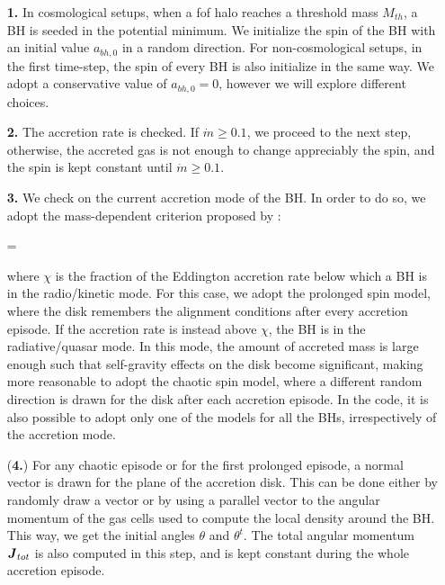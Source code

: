 \documentclass[a4,useAMS,usenatbib,usegraphicx,12pt]{article}
\begin{document}
\begin{itemize}

 \item[\textbf{1.}] In cosmological setups, when a fof halo reaches a threshold mass $M_{th}$, a 
 BH is seeded in the potential minimum. We initialize the spin of the BH with an initial value 
 $a_{bh,0}$ in a random direction. For non-cosmological setups, in the first time-step, the spin 
 of every BH is also initialize in the same way. We adopt a conservative value of $a_{bh,0} = 0$, 
 however we will explore different choices.
 
 \item[\textbf{2.}] The accretion rate is checked. If $\dot{m} \geq 0.1$, we proceed to the next 
 step, otherwise, the accreted gas is not enough to change appreciably the spin, and the spin is 
 kept constant until $\dot{m} \geq 0.1$.
 
 \item[\textbf{3.}] We check on the current accretion mode of the BH. In order to do so, we adopt 
 the mass-dependent criterion proposed by \citet{Weinberger2016}:
 
 { \chi = \min {} }
 
 where $\chi$ is the fraction of the Eddington accretion rate below which a BH is in the radio/kinetic 
 mode. For this case, we adopt the prolonged spin model, where the disk remembers the alignment 
 conditions after every accretion episode. If the accretion rate is instead above $\chi$, the BH is 
 in the radiative/quasar mode. In this mode, the amount of accreted mass is large enough such that 
 self-gravity effects on the disk become significant, making more reasonable to adopt the chaotic 
 spin model, where a different random direction is drawn for the disk after each accretion episode.
 In the code, it is also possible to adopt only one of the models for all the BHs, irrespectively of
 the accretion mode.
 
 \item[(\textbf{4.})] For any chaotic episode or for the first prolonged episode, a normal vector is 
 drawn for the plane of the accretion disk. This can be done either by randomly draw a vector or by 
 using a parallel vector to the angular momentum of the gas cells used to compute the local density 
 around the BH. This way, we get the initial angles $\theta$ and $\theta^t$. The total angular 
 momentum $\boldsymbol{ J }_{tot}$ is also computed in this step, and is kept constant during the whole 
 accretion episode.
 

\end{itemize}
\end{document}
